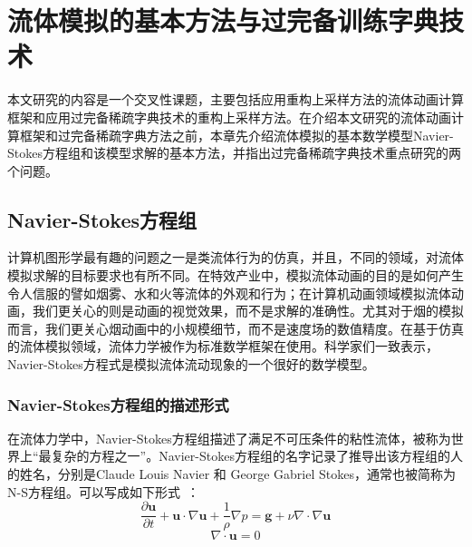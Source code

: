 
\chapter{流体模拟的基本方法与过完备训练字典技术}
\label{chap:fluidSimulation}

本文研究的内容是一个交叉性课题，主要包括应用重构上采样方法的流体动画计算框架和应用过完备稀疏字典技术的重构上采样方法。在介绍本文研究的流体动画计算框架和过完备稀疏字典方法之前，本章先介绍流体模拟的基本数学模型Navier-Stokes方程组和该模型求解的基本方法，并指出过完备稀疏字典技术重点研究的两个问题。

\section{Navier-Stokes方程组}
\label{sec:navier-stokes}

计算机图形学最有趣的问题之一是类流体行为的仿真，并且，不同的领域，对流体模拟求解的目标要求也有所不同。在特效产业中，模拟流体动画的目的是如何产生令人信服的譬如烟雾、水和火等流体的外观和行为；在计算机动画领域模拟流体动画，我们更关心的则是动画的视觉效果，而不是求解的准确性。尤其对于烟的模拟而言，我们更关心烟动画中的小规模细节，而不是速度场的数值精度。在基于仿真的流体模拟领域，流体力学被作为标准数学框架在使用。科学家们一致表示，Navier-Stokes方程式是模拟流体流动现象的一个很好的数学模型。

\subsection{Navier-Stokes方程组的描述形式}

在流体力学中，Navier-Stokes方程组描述了满足不可压条件的粘性流体，被称为世界上“最复杂的方程之一”。Navier-Stokes方程组的名字记录了推导出该方程组的人的姓名，分别是Claude Louis Navier 和 George Gabriel Stokes，通常也被简称为N-S方程组。可以写成如下形式~\cite{bridson2007fluid}：
\begin{equation}
\label{basicEq}
 \frac{\partial \boldsymbol u}{\partial t} + {\boldsymbol u} \cdot \nabla {\boldsymbol u} + \frac{1}{\rho} \nabla p= {\boldsymbol g} + \nu \nabla \cdot \nabla {\boldsymbol u}
\end{equation}
\begin{equation}
\label{imcompressible}
 \nabla \cdot {\boldsymbol u} = 0
\end{equation}

